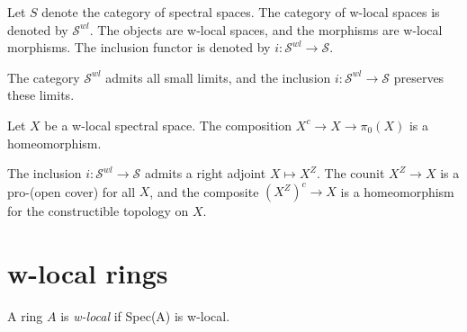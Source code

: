 \begin{definition}
    \label{def:w-local-space-category}

    Let \(S\) denote the category of spectral spaces. The category of w-local spaces is denoted by \(\mathcal{S}^{wl}\). The objects are w-local spaces, and the morphisms are w-local morphisms. The inclusion functor is denoted by \(i: \mathcal{S}^{wl} \to \mathcal{S}\).
\end{definition}

\begin{lemma}
    \label{lem:w-local-space-preserves-limits}

    The category $\mathcal{S}^{wl}$ admits all small limits, and the inclusion $i : \mathcal{S}^{wl} \to \mathcal{S}$ preserves these limits.
\end{lemma}


\begin{lemma}
    \label{lem:w-local-space-connected-components}

    Let $X$ be a w-local spectral space. The composition $X^c \to X \to \pi_0(X)$ is a homeomorphism.
\end{lemma}

\begin{definition}
    \label{def:w-localization-space}
    The inclusion $i : \mathcal{S}^{wl} \to \mathcal{S}$ admits a right adjoint $X \mapsto X^Z$. The counit $X^Z \to X$ is a pro-(open cover) for all $X$, and the composite $(X^Z)^c \to X$ is a homeomorphism for the constructible topology on $X$.
\end{definition}

\section{w-local rings}

\begin{definition}
    A ring \(A\) is \emph{w-local} if Spec(A) is w-local.
    \label{def:w-local-ring}
    \leanok
\end{definition}

